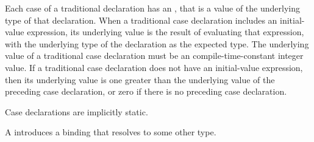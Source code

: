 Each case of a traditional  declaration has an , that is a value of the underlying type of that  declaration.
When a traditional case declaration includes an initial-value expression, its underlying value is the result of evaluating that expression, with the underlying type of the  declaration as the expected type.
The underlying value of a traditional case declaration must be an compile-time-constant integer value.
If a traditional case declaration does not have an initial-value expression, then its underlying value is one greater than the underlying value of the preceding case declaration, or zero if there is no preceding case declaration.

Case declarations are implicitly static.

%
%
%
%
%


A  introduces a binding that resolves to some other type.

\begin{Syntax}
     \\
        \SynOr {}

     \\
          \\
        \SynOpt \\
        \SynOpt \\
        \code{=}  \code{;}
\end{Syntax}

\begin{Checking}

\end{Checking}
    

